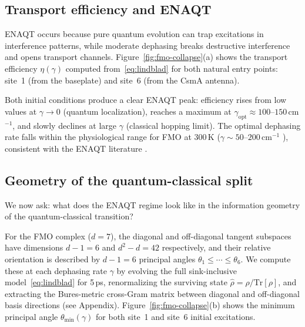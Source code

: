 \documentclass[12pt,a4paper]{article}
\theoremstyle{definition}
\theoremstyle{remark}
\begin{document}
\subsection{Transport efficiency and ENAQT}
\label{sec:fmo-enaqt}

ENAQT \cite{rebentrost2009environment,plenio2008dephasing} occurs because pure quantum evolution can trap excitations in interference patterns, while moderate dephasing breaks destructive interference and opens transport channels. Figure~\ref{fig:fmo-collapse}(a) shows the transport efficiency $\eta(\gamma)$ computed from~\eqref{eq:lindblad} for both natural entry points: site~1 (from the baseplate) and site~6 (from the CsmA antenna).

Both initial conditions produce a clear ENAQT peak: efficiency rises from low values at $\gamma \to 0$ (quantum localization), reaches a maximum at $\gamma_{\mathrm{opt}} \approx 100$--$150$\,cm$^{-1}$, and slowly declines at large $\gamma$ (classical hopping limit). The optimal dephasing rate falls within the physiological range for FMO at 300\,K ($\gamma \sim 50$--$200$\,cm$^{-1}$ \cite{cao2020quantum}), consistent with the ENAQT literature \cite{rebentrost2009environment}.

\subsection{Geometry of the quantum-classical split}
\label{sec:fmo-geometry}

We now ask: what does the ENAQT regime look like in the information geometry of the quantum-classical transition?

For the FMO complex ($d = 7$), the diagonal and off-diagonal tangent subspaces have dimensions $d - 1 = 6$ and $d^2 - d = 42$ respectively, and their relative orientation is described by $d - 1 = 6$ principal angles $\theta_1 \leq \cdots \leq \theta_6$. We compute these at each dephasing rate $\gamma$ by evolving the full sink-inclusive model~\eqref{eq:lindblad} for 5\,ps, renormalizing the surviving state $\hat{\rho} = \rho/\mathrm{Tr}[\rho]$, and extracting the Bures-metric cross-Gram matrix between diagonal and off-diagonal basis directions (see Appendix). Figure~\ref{fig:fmo-collapse}(b) shows the minimum principal angle $\theta_{\min}(\gamma)$ for both site~1 and site~6 initial excitations.
\end{document}

